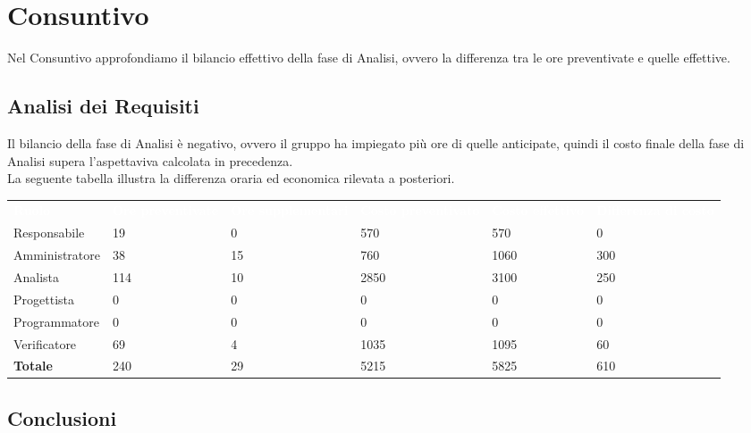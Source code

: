 \section{Consuntivo}
Nel Consuntivo approfondiamo il bilancio effettivo della fase di Analisi, ovvero la differenza tra le ore preventivate e quelle effettive.

\subsection{Analisi dei Requisiti}

Il bilancio della fase di Analisi è negativo, ovvero il gruppo ha impiegato più ore di quelle anticipate, quindi il costo finale della fase di Analisi supera l'aspettaviva calcolata in precedenza.\\
La seguente tabella illustra la differenza oraria ed economica rilevata a posteriori.

\renewcommand{\arraystretch}{2}
\centering
\begin{table}
\caption{Tabella del costo complessivo per ruolo}
\begin{longtable}{ C{2.5cm} C{2.5cm} C{2.5cm} C{2.5cm} C{2.5cm} C{2.5cm}}
	\textcolor{white}{\textbf{Ruolo}} & \textcolor{white}{\textbf{Ore preventivate}} & \textcolor{white}{\textbf{Ore supplementari}} & \textcolor{white}{\textbf{Costo preventivato}} & \textcolor{white}{\textbf{Costo effettivo}} & \textcolor{white}{\textbf{Differenza di costo}}\\	
	
	Responsabile & 19 & 0 & 570 & 570 & 0 \\
	Amministratore & 38 & 15 & 760 & 1060 & 300 \\
	Analista & 114 & 10 & 2850 & 3100 & 250 \\
	Progettista & 0 & 0 & 0 & 0 & 0 \\
	Programmatore & 0 & 0 & 0 & 0 & 0 \\
	Verificatore & 69 & 4 & 1035 & 1095 & 60 \\
	\textbf{Totale} & 240 & 29 & 5215 & 5825 & 610 \\	
	
\end{longtable}
\end{table}

\subsection{Conclusioni}

